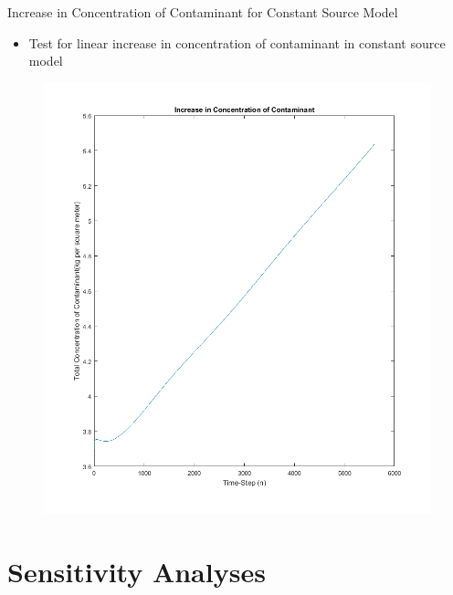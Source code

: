 \documentclass[10pt]{beamer}
\begin{document}
\begin{frame}{Increase in Concentration of Contaminant for Constant Source Model}\label{ConstIncrease}
\begin{itemize}
\item Test for linear increase in concentration of contaminant in constant source model
\end{itemize}
\begin{figure} 
\includegraphics[trim=0mm 0mm 0mm 0mm,clip,width=0.5\linewidth]{constincrease.png}
\end{figure}
\hyperlink{Questions}{}
\end{frame}

\section{Sensitivity Analyses}
\end{document}
